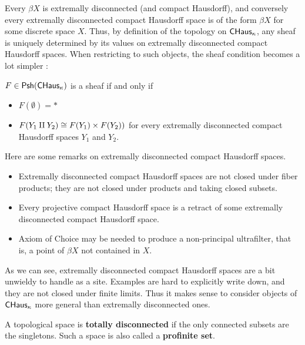\documentclass[./main.tex]{subfiles}
\begin{document}
Every $\beta X$ is extremally disconnected (and compact Hausdorff), and conversely every extremally disconnected compact Hausdorff space is of the form $\beta X$ for some discrete space $X$. Thus, by definition of the topology on $\mathsf{CHaus}_\kappa$, any sheaf is uniquely determined by its values on extremally disconnected compact Hausdorff spaces. When restricting to such objects, the sheaf condition becomes a lot simpler : 

\begin{lemma}
$F \in \mathsf{Psh}(\mathsf{CHaus}_\kappa)$ is a sheaf if and only if
\begin{itemize}
\item $F(\emptyset) = *$
\item $F(Y_1 \amalg Y_2) \cong F(Y_1) \times F(Y_2))$ for every extremally disconnected compact Hausdorff spaces $Y_1$ and $Y_2$.
\end{itemize}
\end{lemma}

Here are some remarks on extremally disconnected compact Hausdorff spaces. 

\begin{rem}\hfill
\begin{itemize}
\item Extremally disconnected compact Hausdorff spaces are not closed under fiber products; they are not closed under products and taking closed subsets. 
\item Every projective compact Hausdorff space is a retract of some extremally disconnected compact Hausdorff space.
\item Axiom of Choice may be needed to produce a non-principal ultrafilter, that is, a point of $\beta X$ not contained in $X$. 
\end{itemize}
\end{rem}

As we can see, extremally disconnected compact Hausdorff spaces are a bit unwieldy to handle as a site. Examples are hard to explicitly write down, and they are not closed under finite limits. Thus it makes sense to consider objects of $\mathsf{CHaus}_\kappa$ more general than extremally disconnected ones. 

\begin{definition}
A topological space is \textbf{totally disconnected} if the only connected subsets are the singletons. Such a space is also called a \textbf{profinite set}.
\end{definition}
\end{document}
